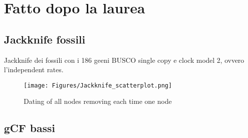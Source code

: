 \section{Fatto dopo la laurea}
\subsection{Jackknife fossili}
Jackknife dei fossili con i 186 geeni BUSCO single copy e clock model 2, ovvero l'independent rates.

\begin{figure}[h!]
    \centering
    \texttt{[image: Figures/Jackknife\_scatterplot.png]}
    \caption[Fossil Jackknife]{Dating of all nodes removing each time one node
}
    \label{fig:lsd2tree}
\end{figure}

\subsection{gCF bassi}
